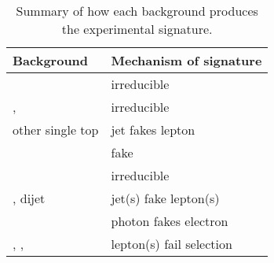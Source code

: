\begin{table}[t]
	\begin{tabular}{l@{\hskip 0.3in}l}
		\toprule
		Background        & Mechanism of \HepProcess{\Plepton\Plepton + \met} signature \\
		\midrule
		\WW               & irreducible \\
		\ttbar, \HepProcess{\PW \Ptop} & irreducible \\
		other single top  & jet fakes lepton \\
		\DYll             & fake \met \\
		\DYtt             & irreducible \\
		\Wjets, dijet     & jet(s) fake lepton(s) \\
		\Wgamma           & photon fakes electron \\
		\WZ, \Wgstar, \ZZ & lepton(s) fail selection \\
		\bottomrule
	\end{tabular}
	\caption{Summary of how each background produces the 
	\HepProcess{\Plepton\Plepton + \met} experimental signature.}
	\label{tab:bkg_summary}
\end{table}
